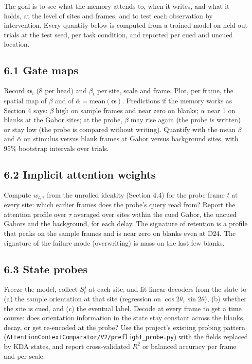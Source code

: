 \documentclass[

]{article}
\begin{document}
The goal is to see what the memory attends to, when it writes, and what it holds, at the level of sites and frames, and to test each observation by intervention. Every quantity below is computed from a trained model on held-out trials at the test seed, per task condition, and reported per cued and uncued location.



\subsection{6.1 Gate maps}\label{gate-maps}



Record \(\boldsymbol\alpha_t\) (8 per head) and \(\beta_t\) per site, scale and frame. Plot, per frame, the spatial map of \(\beta\) and of \(\bar\alpha=\mathrm{mean}(\boldsymbol\alpha)\). Predictions if the memory works as Section 4 says: \(\beta\) high on sample frames and near zero on blanks; \(\bar\alpha\) near 1 on blanks at the Gabor sites; at the probe, \(\beta\) may rise again (the probe is written) or stay low (the probe is compared without writing). Quantify with the mean \(\beta\) and \(\bar\alpha\) on stimulus versus blank frames at Gabor versus background sites, with 95\% bootstrap intervals over trials.



\subsection{6.2 Implicit attention weights}\label{implicit-attention-weights}



Compute \(w_{t,\tau}\) from the unrolled identity (Section 4.4) for the probe frame \(t\) at every site: which earlier frames does the probe's query read from? Report the attention profile over \(\tau\) averaged over sites within the cued Gabor, the uncued Gabors and the background, for each delay. The signature of retention is a profile that peaks on the sample frames and is near zero on blanks even at D24. The signature of the failure mode (overwriting) is mass on the last few blanks.



\subsection{6.3 State probes}\label{state-probes}



Freeze the model, collect \(S^s_t\) at each site, and fit linear decoders from the state to (a) the sample orientation at that site (regression on \(\cos2\theta,\sin2\theta\)), (b) whether the site is cued, and (c) the eventual label. Decode at every frame to get a time course: does orientation information in the state stay constant across the blanks, decay, or get re-encoded at the probe? Use the project's existing probing pattern (\texttt{AttentionContextComparator/V2/preflight\_probe.py}) with the fields replaced by KDA states, and report cross-validated \(R^2\) or balanced accuracy per frame and per scale.
\end{document}
